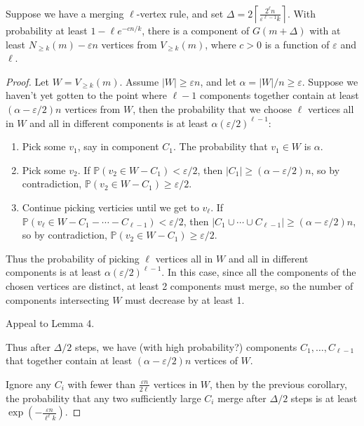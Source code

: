 \documentclass[twoside,10pt]{report}
\begin{document}
\setcounter{lem}{5}
\begin{lem}
	Suppose we have a merging $\ell$-vertex rule, and set $\Delta = 2 \left\lceil \frac{2^{\ell}n}{\varepsilon^{\ell-1}k} \right\rceil$. With probability at least $1- \ell e^{-cn/k}$, there is a component of $G(m+\Delta)$ with at least $N_{\geq k}(m)-\varepsilon n$ vertices from $V_{\geq k}(m)$, where $c>0$ is a function of $\varepsilon$ and $\ell$.
\end{lem}
\begin{proof}
	Let $W = V_{\geq k}(m)$. Assume $|W| \geq \varepsilon n$, and let $\alpha = |W|/n \geq \varepsilon$. Suppose we haven't yet gotten to the point where $\ell-1$ components together contain at least $(\alpha-\varepsilon/2)n$ vertices from $W$, then the probability that we choose $\ell$ vertices all in $W$ and all in different components is at least $\alpha(\varepsilon/2)^{\ell-1}$:
	\begin{enumerate}
		\item Pick some $v_1$, say in component $C_1$. The probability that $v_1 \in W$ is $\alpha$.
		\item Pick some $v_2$. If $\mathbb{P}(v_2 \in W-C_1) < \varepsilon/2$, then $|C_1| \geq (\alpha-\varepsilon/2)n$, so by contradiction, $\mathbb{P}(v_2 \in W-C_1) \geq \varepsilon/2$.
		\item Continue picking verticies until we get to $v_{\ell}$. If $\mathbb{P}(v_{\ell} \in W-C_1-\cdots-C_{\ell-1}) < \varepsilon/2$, then $|C_1 \cup \cdots \cup C_{\ell-1}| \geq (\alpha-\varepsilon/2)n$, so by contradiction, $\mathbb{P}(v_2 \in W-C_1) \geq \varepsilon/2$.
	\end{enumerate}
	Thus the probability of picking $\ell$ vertices all in $W$ and all in different components is at least $\alpha(\varepsilon/2)^{\ell-1}$. In this case, since all the components of the chosen vertices are distinct, at least 2 components must merge, so the number of components intersecting $W$ must decrease by at least 1.

	{\color{red}Appeal to Lemma 4.}

	Thus after $\Delta/2$ steps, we have {\color{red}(with high probability?)} components $C_1, \dots, C_{\ell-1}$ that together contain at least $(\alpha-\varepsilon/2)n$ vertices of $W$.

	Ignore any $C_i$ with fewer than $\frac{\varepsilon n}{2\ell} $ vertices in $W$, then by the previous corollary, the probability that any two sufficiently large $C_i$ merge after $\Delta/2$ steps is at least $\exp\left(-\frac{\varepsilon n}{\ell^\ell k}\right)$.


\end{proof}
\end{document}

